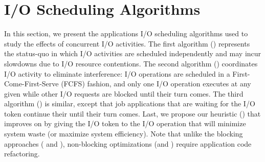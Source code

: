 
\section{I/O Scheduling Algorithms}
\label{sec:algorithms}


In this section, we present the applications I/O scheduling algorithms used to study
the effects of concurrent I/O activities.  The first algorithm (\nocoop) represents
the status-quo in which I/O activities are scheduled independently and may incur
slowdowns due to I/O resource contentions. The second algorithm (\fifoblock)
coordinates I/O activity to eliminate interference: I/O operations are scheduled in a
First-Come-First-Serve (FCFS) fashion, and only one I/O operation executes at any
given while other I/O requests are blocked until their turn comes.  The third
algorithm (\fifononblock) is similar, except that job applications that are waiting
for the I/O token continue their until their turn comes.
Last, we propose our heuristic (\leastwaste) that improves on \fifononblock by giving
the I/O token to the I/O operation that will minimize system waste (or maximize
system efficiency). Note that unlike the blocking approaches (\nocoop
and \fifoblock), non-blocking optimizations (\fifononblock and
\cooperative) require application code refactoring.



